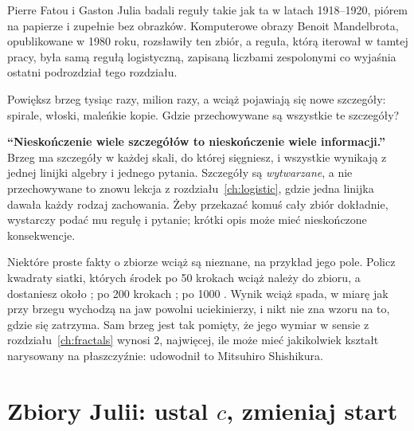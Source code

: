 
\noindent
Pierre Fatou i Gaston Julia badali reguły takie jak ta w latach 1918--1920,
piórem na papierze i zupełnie bez obrazków. Komputerowe obrazy Benoit
Mandelbrota, opublikowane w 1980 roku, rozsławiły ten zbiór, a reguła,
którą iterował w tamtej pracy, była samą regułą logistyczną, zapisaną
liczbami zespolonymi \dash{} co wyjaśnia ostatni podrozdział tego
rozdziału.

\begin{think}
Powiększ brzeg tysiąc razy, milion razy, a wciąż pojawiają się nowe
szczegóły: spirale, włoski, maleńkie kopie. Gdzie przechowywane są
wszystkie te szczegóły?
\end{think}

\begin{trapbox}
\textbf{\enquote{Nieskończenie wiele szczegółów to nieskończenie wiele
informacji.}} Brzeg ma szczegóły w każdej skali, do której sięgniesz, i
wszystkie wynikają z jednej linijki algebry i jednego pytania. Szczegóły są
\emph{wytwarzane}, a nie przechowywane \dash{} to znowu lekcja z
rozdziału~\ref{ch:logistic}, gdzie jedna linijka dawała każdy rodzaj
zachowania. Żeby przekazać komuś cały zbiór dokładnie, wystarczy podać mu
regułę i pytanie; krótki opis może mieć nieskończone konsekwencje.
\end{trapbox}

\noindent
Niektóre proste fakty o zbiorze wciąż są nieznane, na przykład jego pole.
Policz kwadraty siatki, których środek po 50 krokach wciąż należy do
zbioru, a dostaniesz około ; po 200 krokach
; po 1000 . Wynik wciąż spada, w
miarę jak przy brzegu wychodzą na jaw powolni uciekinierzy, i nikt nie zna
wzoru na to, gdzie się zatrzyma. Sam brzeg jest tak pomięty, że jego wymiar
w sensie z rozdziału~\ref{ch:fractals} wynosi $2$, najwięcej, ile może mieć
jakikolwiek kształt narysowany na płaszczyźnie: udowodnił to Mitsuhiro
Shishikura.

\section{Zbiory Julii: ustal \texorpdfstring{$c$}{c}, zmieniaj start}
\label{sec:ch12-julia}

